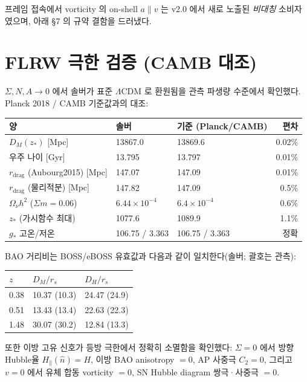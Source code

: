 \documentclass[11pt]{article}
\newcommand{\Sig}{\Sigma}
\newcommand{\nhat}{\hat{n}}
\begin{document}
프레임 접속에서 vorticity 의 on-shell $a\parallel v$ 는 v2.0 에서 새로 노출된
\emph{비대칭} 소비자였으며, 아래 \S7 의 규약 결함을 드러냈다.

\section{FLRW 극한 검증 (CAMB 대조)}

$\Sig,N,A\to0$ 에서 솔버가 표준 $\Lambda$CDM 로 환원됨을 관측 파생량 수준에서 확인했다.
Planck 2018 / CAMB 기준값과의 대조:

\begin{center}
\begin{tabular}{@{}lllr@{}}
\toprule
양 & 솔버 & 기준 (Planck/CAMB) & 편차 \\
\midrule
$D_M(z_*)$ [Mpc] & 13867.0 & 13869.6 & 0.02\% \\
우주 나이 [Gyr] & 13.795 & 13.797 & 0.01\% \\
$r_\mathrm{drag}$ (Aubourg2015) [Mpc] & 147.07 & 147.09 & 0.01\% \\
$r_\mathrm{drag}$ (물리적분) [Mpc] & 147.82 & 147.09 & 0.5\% \\
$\Omega_\nu h^2$ ($\Sigma m{=}0.06$) & $6.44\times10^{-4}$ & $6.4\times10^{-4}$ & 0.6\% \\
$z_*$ (가시함수 최대) & 1077.6 & 1089.9 & 1.1\% \\
$g_*$ 고온/저온 & 106.75 / 3.363 & 106.75 / 3.363 & 정확 \\
\bottomrule
\end{tabular}
\end{center}

BAO 거리비는 BOSS/eBOSS 유효값과 다음과 같이 일치한다(솔버; 괄호는 관측):

\begin{center}
\begin{tabular}{@{}lll@{}}
\toprule
$z$ & $D_M/r_s$ & $D_H/r_s$ \\
\midrule
0.38 & 10.37 (10.3) & 24.47 (24.9) \\
0.51 & 13.43 (13.4) & 22.63 (22.3) \\
1.48 & 30.07 (30.2) & 12.84 (13.3) \\
\bottomrule
\end{tabular}
\end{center}

또한 이방 고유 신호가 등방 극한에서 정확히 소멸함을 확인했다: $\Sig=0$ 에서
방향 Hubble율 $H_\parallel(\nhat)=H$, 이방 BAO anisotropy $=0$, AP 사중극 $C_2=0$,
그리고 $v=0$ 에서 유체 합동 vorticity $=0$, SN Hubble diagram 쌍극·사중극 $=0$.
\end{document}
